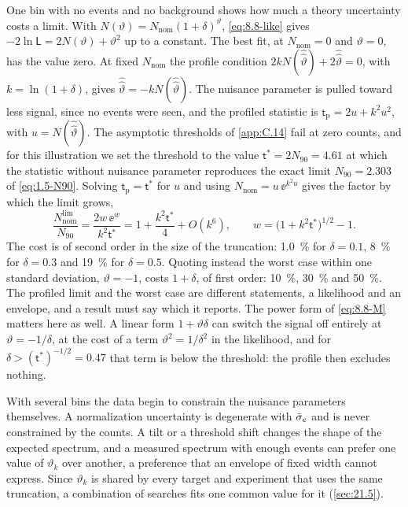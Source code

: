 One bin with no events and no background shows how much a theory uncertainty costs a limit. With $N(\vartheta) = N_{\mathrm{nom}}(1 + \delta)^\vartheta$, \cref{eq:8.8-like} gives $-2\ln\mathsf{L} = 2N(\vartheta) + \vartheta^2$ up to a constant. The best fit, at $N_{\mathrm{nom}} = 0$ and $\vartheta = 0$, has the value zero. At fixed $N_{\mathrm{nom}}$ the profile condition $2kN(\hat{\hat\vartheta}) + 2\hat{\hat\vartheta} = 0$, with $k = \ln(1 + \delta)$, gives $\hat{\hat\vartheta} = -kN(\hat{\hat\vartheta})$. The nuisance parameter is pulled toward less signal, since no events were seen, and the profiled statistic is $\mathsf{t}_{\mathrm{p}} = 2u + k^2u^2$, with $u = N(\hat{\hat\vartheta})$. The asymptotic thresholds of \cref{app:C.14} fail at zero counts, and for this illustration we set the threshold to the value $\mathsf{t}^* = 2N_{90} = 4.61$ at which the statistic without nuisance parameter reproduces the exact limit $N_{90} = 2.303$ of \cref{eq:1.5-N90}. Solving $\mathsf{t}_{\mathrm{p}} = \mathsf{t}^*$ for $u$ and using $N_{\mathrm{nom}} = u\,\ee^{k^2u}$ gives the factor by which the limit grows,
\begin{equation}
  \frac{N_{\mathrm{nom}}^{\mathrm{lim}}}{N_{90}} = \frac{2w\,\ee^{w}}{k^2\mathsf{t}^*} = 1 + \frac{k^2\mathsf{t}^*}{4} + O(k^6) , \qquad w = \bigl(1 + k^2\mathsf{t}^*\bigr)^{1/2} - 1 .
  \label{eq:8.8-cost}
\end{equation}
The cost is of second order in the size of the truncation: \SI{1.0}{\percent} for $\delta = 0.1$, \SI{8}{\percent} for $\delta = 0.3$ and \SI{19}{\percent} for $\delta = 0.5$. Quoting instead the worst case within one standard deviation, $\vartheta = -1$, costs $1 + \delta$, of first order: \SI{10}{\percent}, \SI{30}{\percent} and \SI{50}{\percent}. The profiled limit and the worst case are different statements, a likelihood and an envelope, and a result must say which it reports. The power form of \cref{eq:8.8-M} matters here as well. A linear form $1 + \vartheta\delta$ can switch the signal off entirely at $\vartheta = -1/\delta$, at the cost of a term $\vartheta^2 = 1/\delta^2$ in the likelihood, and for $\delta > (\mathsf{t}^*)^{-1/2} = 0.47$ that term is below the threshold: the profile then excludes nothing.

With several bins the data begin to constrain the nuisance parameters themselves. A normalization uncertainty is degenerate with $\bar{\sigma}_{e}$ and is never constrained by the counts. A tilt or a threshold shift changes the shape of the expected spectrum, and a measured spectrum with enough events can prefer one value of $\vartheta_k$ over another, a preference that an envelope of fixed width cannot express. Since $\vartheta_k$ is shared by every target and experiment that uses the same truncation, a combination of searches fits one common value for it (\cref{sec:21.5}).


